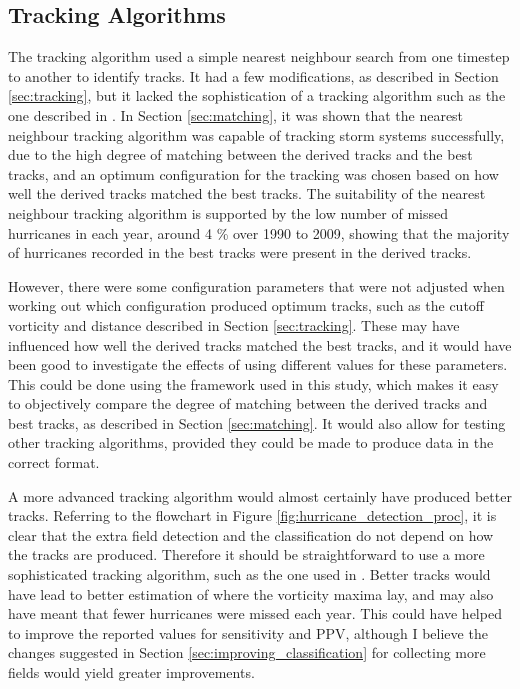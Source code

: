 \documentclass[pdftex,12pt,a4paper]{report}
\begin{document}
\subsection{Tracking Algorithms}
\label{sec:discussion_tracking_algs}
The tracking algorithm used a simple nearest neighbour search from one timestep to another to
identify tracks. It had a few modifications, as described in Section \ref{sec:tracking}, but it
lacked the sophistication of a tracking algorithm such as the one described in
\textcite{hodges1994general, hodges1999adaptive}. In Section \ref{sec:matching}, it was
shown that the nearest neighbour tracking algorithm was capable of tracking storm systems
successfully, due to the high degree of matching between the derived tracks and the best tracks, and
an optimum configuration for the tracking was chosen based on how well the derived tracks matched
the best tracks. The suitability of the nearest neighbour tracking algorithm is supported by the low
number of missed hurricanes in each year, around 4 \% over 1990 to 2009, showing that the majority
of hurricanes recorded in the best tracks were present in the derived tracks. 

However, there were some configuration parameters that were not adjusted when working out which
configuration produced optimum tracks, such as the cutoff vorticity and distance described in Section
\ref{sec:tracking}. These may have influenced how well the derived tracks matched the best tracks,
and it would have been good to investigate the effects of using different values for these
parameters. This could be done using the framework used in this study, which makes it easy to
objectively compare the degree of matching between the derived tracks and best tracks, as described
in Section \ref{sec:matching}. It would also allow for testing other tracking algorithms, provided
they could be made to produce data in the correct format. 

A more advanced tracking algorithm would almost certainly have produced better tracks. Referring to
the flowchart in Figure \ref{fig:hurricane_detection_proc}, it is clear that the extra field
detection and the classification do not depend on how the tracks are produced. Therefore it
should be straightforward to use a more sophisticated tracking algorithm, such as the one used in
\textcite{thorncroft2001african}. Better tracks would have lead to better estimation of where the
vorticity maxima lay, and may also have meant that fewer hurricanes were missed each year. This
could have helped to improve the reported values for sensitivity and PPV, although I believe the
changes suggested in Section \ref{sec:improving_classification} for collecting more fields
would yield greater improvements.
\end{document}
